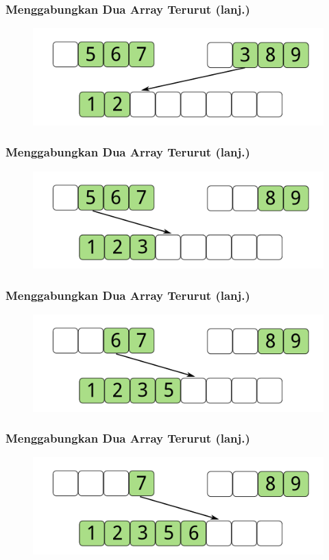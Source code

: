 \begin{frame}
\frametitle{Menggabungkan Dua Array Terurut (lanj.)}
\begin{figure}
  \centering
  \includegraphics[width=10 cm]{asset/merge-array-pair-4.pdf}
\end{figure}
\end{frame}

\begin{frame}
\frametitle{Menggabungkan Dua Array Terurut (lanj.)}
\begin{figure}
  \centering
  \includegraphics[width=10 cm]{asset/merge-array-pair-5.pdf}
\end{figure}
\end{frame}

\begin{frame}
\frametitle{Menggabungkan Dua Array Terurut (lanj.)}
\begin{figure}
  \centering
  \includegraphics[width=10 cm]{asset/merge-array-pair-6.pdf}
\end{figure}
\end{frame}

\begin{frame}
\frametitle{Menggabungkan Dua Array Terurut (lanj.)}
\begin{figure}
  \centering
  \includegraphics[width=10 cm]{asset/merge-array-pair-7.pdf}
\end{figure}
\end{frame}


